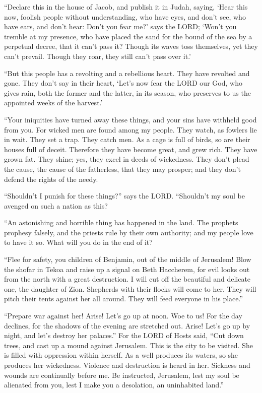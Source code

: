 \myverse{}“Declare this in the house of Jacob, and publish it in Judah, saying, \myverse{}‘Hear this now, foolish people without understanding, who have eyes, and don’t see, who have ears, and don’t hear: \myverse{}Don’t you fear me?’ says the LORD; ‘Won’t you tremble at my presence, who have placed the sand for the bound of the sea by a perpetual decree, that it can’t pass it? Though its waves toss themselves, yet they can’t prevail. Though they roar, they still can’t pass over it.’


\myverse{}“But this people has a revolting and a rebellious heart. They have revolted and gone. \myverse{}They don’t say in their heart, ‘Let’s now fear the LORD our God, who gives rain, both the former and the latter, in its season, who preserves to us the appointed weeks of the harvest.’


\myverse{}“Your iniquities have turned away these things, and your sins have withheld good from you. \myverse{}For wicked men are found among my people. They watch, as fowlers lie in wait. They set a trap. They catch men. \myverse{}As a cage is full of birds, so are their houses full of deceit. Therefore they have become great, and grew rich. \myverse{}They have grown fat. They shine; yes, they excel in deeds of wickedness. They don’t plead the cause, the cause of the fatherless, that they may prosper; and they don’t defend the rights of the needy.


\myverse{}“Shouldn’t I punish for these things?” says the LORD. “Shouldn’t my soul be avenged on such a nation as this?


\myverse{}“An astonishing and horrible thing has happened in the land. \myverse{}The prophets prophesy falsely, and the priests rule by their own authority; and my people love to have it so. What will you do in the end of it?


\mychapter{} \myverse*{}“Flee for safety, you children of Benjamin, out of the middle of Jerusalem! Blow the shofar in Tekoa and raise up a signal on Beth Haccherem, for evil looks out from the north with a great destruction. \myverse{}I will cut off the beautiful and delicate one, the daughter of Zion. \myverse{}Shepherds with their flocks will come to her. They will pitch their tents against her all around. They will feed everyone in his place.”


\myverse{}“Prepare war against her! Arise! Let’s go up at noon. Woe to us! For the day declines, for the shadows of the evening are stretched out. \myverse{}Arise! Let’s go up by night, and let’s destroy her palaces.” \myverse{}For the LORD of Hosts said, “Cut down trees, and cast up a mound against Jerusalem. This is the city to be visited. She is filled with oppression within herself. \myverse{}As a well produces its waters, so she produces her wickedness. Violence and destruction is heard in her. Sickness and wounds are continually before me. \myverse{}Be instructed, Jerusalem, lest my soul be alienated from you, lest I make you a desolation, an uninhabited land.”


